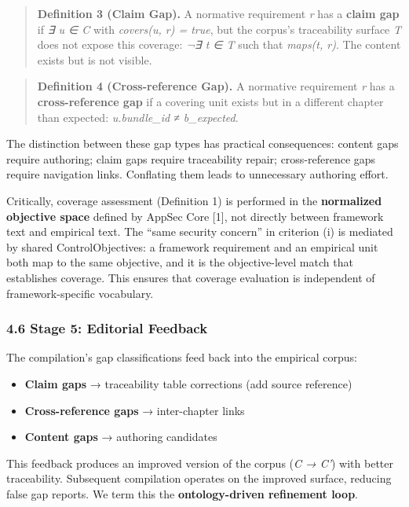 \documentclass[
]{article}
\providecommand{\tightlist}{%
  \setlength{\itemsep}{0pt}\setlength{\parskip}{0pt}}
\begin{document}
\begin{quote}
\textbf{Definition 3 (Claim Gap).} A normative requirement \emph{r} has
a \textbf{claim gap} if \emph{∃ u ∈ C} with \emph{covers(u, r) = true},
but the corpus's traceability surface \emph{T} does not expose this
coverage: \emph{¬∃ t ∈ T} such that \emph{maps(t, r)}. The content
exists but is not visible.
\end{quote}

\begin{quote}
\textbf{Definition 4 (Cross-reference Gap).} A normative requirement
\emph{r} has a \textbf{cross-reference gap} if a covering unit exists
but in a different chapter than expected: \emph{u.bundle\_id ≠
b\_expected}.
\end{quote}

The distinction between these gap types has practical consequences:
content gaps require authoring; claim gaps require traceability repair;
cross-reference gaps require navigation links. Conflating them leads to
unnecessary authoring effort.

Critically, coverage assessment (Definition 1) is performed in the
\textbf{normalized objective space} defined by AppSec Core {[}1{]}, not
directly between framework text and empirical text. The ``same security
concern'' in criterion (i) is mediated by shared ControlObjectives: a
framework requirement and an empirical unit both map to the same
objective, and it is the objective-level match that establishes
coverage. This ensures that coverage evaluation is independent of
framework-specific vocabulary.

\subsubsection{4.6 Stage 5: Editorial
Feedback}\label{stage-5-editorial-feedback}

The compilation's gap classifications feed back into the empirical
corpus:

\begin{itemize}
\tightlist
\item
  \textbf{Claim gaps} → traceability table corrections (add source
  reference)
\item
  \textbf{Cross-reference gaps} → inter-chapter links
\item
  \textbf{Content gaps} → authoring candidates
\end{itemize}

This feedback produces an improved version of the corpus (\emph{C → C'})
with better traceability. Subsequent compilation operates on the
improved surface, reducing false gap reports. We term this the
\textbf{ontology-driven refinement loop}.
\end{document}

